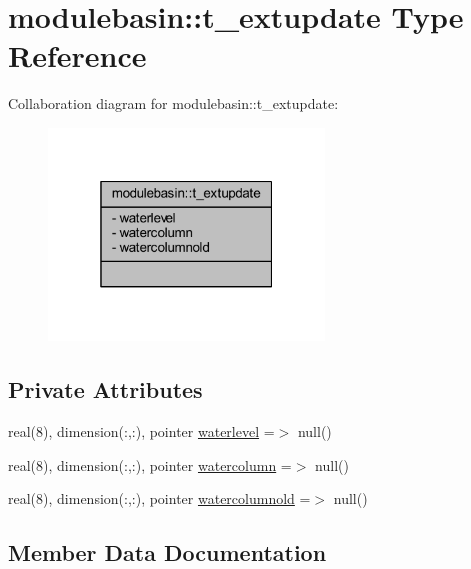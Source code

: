 \hypertarget{structmodulebasin_1_1t__extupdate}{}\section{modulebasin\+:\+:t\+\_\+extupdate Type Reference}
\label{structmodulebasin_1_1t__extupdate}


Collaboration diagram for modulebasin\+:\+:t\+\_\+extupdate\+:\nopagebreak
\begin{figure}[H]
\begin{center}
\leavevmode
\includegraphics[width=208pt]{structmodulebasin_1_1t__extupdate__coll__graph}
\end{center}
\end{figure}
\subsection*{Private Attributes}
\begin{DoxyCompactItemize}
\item 
real(8), dimension(\+:,\+:), pointer \mbox{\hyperlink{structmodulebasin_1_1t__extupdate_a97a7800b63d16b66c321172d1ae42f5f}{waterlevel}} =$>$ null()
\item 
real(8), dimension(\+:,\+:), pointer \mbox{\hyperlink{structmodulebasin_1_1t__extupdate_aa33895791d51351a58acdf0b8a62f17a}{watercolumn}} =$>$ null()
\item 
real(8), dimension(\+:,\+:), pointer \mbox{\hyperlink{structmodulebasin_1_1t__extupdate_ae38c4fd65bb04d3ff2dd1ee800704d62}{watercolumnold}} =$>$ null()
\end{DoxyCompactItemize}


\subsection{Member Data Documentation}
\mbox{\label{structmodulebasin_1_1t__extupdate_aa33895791d51351a58acdf0b8a62f17a}} 
